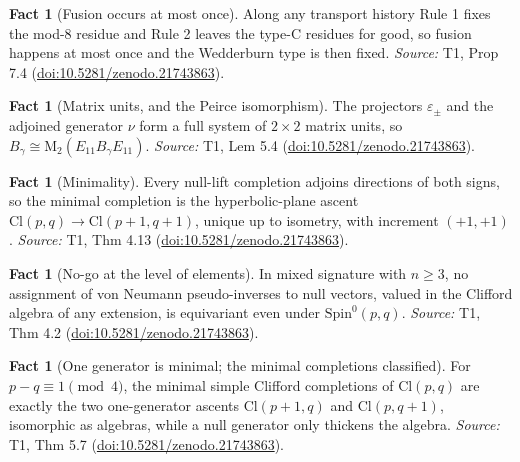 \documentclass[11pt]{article}
\theoremstyle{definition}
\newtheorem{fact}[theorem]{Fact}
\theoremstyle{plain}
\providecommand{\Cl}{}\renewcommand{\Cl}{\mathrm{Cl}}
\providecommand{\Mat}{}\renewcommand{\Mat}{\mathrm{M}}
\providecommand{\Spin}{}\renewcommand{\Spin}{\mathrm{Spin}}
\begin{document}
\begin{fact}[Fusion occurs at most once]\label{c:transport.fusion-occurs-most-once}
Along any transport history Rule 1 fixes the mod-8 residue and Rule 2 leaves the type-C residues for good, so fusion happens at most once and the Wedderburn type is then fixed.
\emph{Source:} T1, Prop 7.4 (\href{https://doi.org/10.5281/zenodo.21743863}{doi:10.5281/zenodo.21743863}).
\end{fact}

\begin{fact}[Matrix units, and the Peirce isomorphism]\label{c:transport.matrix-units-peirce-isomorphism}
The projectors $\varepsilon_\pm$ and the adjoined generator $\nu$ form a full system of $2 \times 2$ matrix units, so $B_\gamma \cong \Mat_2(E_{11} B_\gamma E_{11})$.
\emph{Source:} T1, Lem 5.4 (\href{https://doi.org/10.5281/zenodo.21743863}{doi:10.5281/zenodo.21743863}).
\end{fact}

\begin{fact}[Minimality]\label{c:transport.minimality}
Every null-lift completion adjoins directions of both signs, so the minimal completion is the hyperbolic-plane ascent $\Cl(p,q) \to \Cl(p{+}1,q{+}1)$, unique up to isometry, with increment $(+1,+1)$.
\emph{Source:} T1, Thm 4.13 (\href{https://doi.org/10.5281/zenodo.21743863}{doi:10.5281/zenodo.21743863}).
\end{fact}

\begin{fact}[No-go at the level of elements]\label{c:transport.no-go-level-elements}
In mixed signature with $n \geq 3$, no assignment of von Neumann pseudo-inverses to null vectors, valued in the Clifford algebra of any extension, is equivariant even under $\Spin^0(p,q)$.
\emph{Source:} T1, Thm 4.2 (\href{https://doi.org/10.5281/zenodo.21743863}{doi:10.5281/zenodo.21743863}).
\end{fact}

\begin{fact}[One generator is minimal; the minimal completions classified]\label{c:transport.one-generator-minimal-minimal-completions-classified}
For $p - q \equiv 1 \pmod 4$, the minimal simple Clifford completions of $\Cl(p,q)$ are exactly the two one-generator ascents $\Cl(p{+}1,q)$ and $\Cl(p,q{+}1)$, isomorphic as algebras, while a null generator only thickens the algebra.
\emph{Source:} T1, Thm 5.7 (\href{https://doi.org/10.5281/zenodo.21743863}{doi:10.5281/zenodo.21743863}).
\end{fact}
\end{document}
